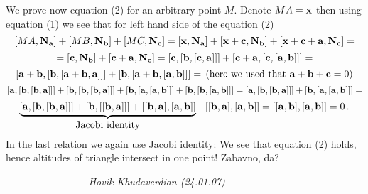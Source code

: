  We  prove now  equation (2) for an arbitrary  point $M$. 
   Denote $MA={\bf x}$ then
  using equation (1)
we see that
for  left hand side of the equation (2) 
          $$ 
[MA,{\bf N}_{\bf a}]+[MB,{\bf N}_{\bf b}]+[MC,{\bf N}_{\bf c }]= 
[{\bf x},{\bf N}_{\bf a}]+[{\bf x}+{\bf c },{\bf N}_{\bf b}]+[{\bf x}+{\bf c }+{\bf a},{\bf N}_{\bf c }]=
          $$      
          $$      
  =[{\bf c },{\bf N}_{\bf b}]+[{\bf c }+{\bf a},{\bf N}_{\bf c }]=
   [{\bf c },[{\bf b},[{\bf c },{\bf a}]]]+[{\bf c }+{\bf a},[{\bf c },[{\bf a},{\bf b}]]]=
           $$
         $$
   [{\bf a}+{\bf b},[{\bf b},[{\bf a}+{\bf b},{\bf a}]]]+[{\bf b},[{\bf a}+{\bf b},[{\bf a},{\bf b}]]]=\,
    \left(\hbox{here we used that ${\bf a}+{\bf b}+{\bf c }=0$}\right)
        $$
         $$
   [{\bf a},[{\bf b},[{\bf b},{\bf a}]]]+[{\bf b},[{\bf b},[{\bf b},{\bf a}]]]+
 [{\bf b},[{\bf a},[{\bf a},{\bf b}]]]+[{\bf b},[{\bf b},[{\bf a},{\bf b}]]]=
   [{\bf a},[{\bf b},[{\bf b},{\bf a}]]]+
 [{\bf b},[{\bf a},[{\bf a},{\bf b}]]]=
        $$
        $$
   \underbrace
       {
  [{\bf a},[{\bf b},[{\bf b},{\bf a}]]]+
 [{\bf b},[[{\bf b},{\bf a}]]]+
   [[{\bf b},{\bf a}],[{\bf a},{\bf b}]]
          }_{\hbox{Jacobi identity}}-
   [[{\bf b},{\bf a}],[{\bf a},{\bf b}]]=
   [[{\bf a},{\bf b}],[{\bf a},{\bf b}]]=0\,.
         $$
In the last relation we again use Jacobi identity: 
We see that equation (2) holds, hence altitudes 
of triangle intersect in one point!  Zabavno, da?\finish

\medskip

$\qquad\qquad\qquad\qquad$  {\it Hovik Khudaverdian (24.01.07)}



  \bye
